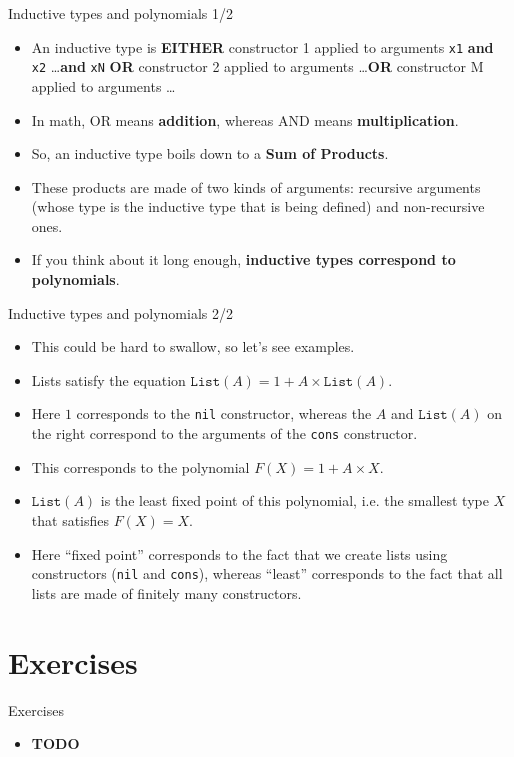 \documentclass{beamer}
\newcommand{\m}[1]{\texttt{#1}}
\begin{document}
\begin{frame}{Inductive types and polynomials 1/2}
\begin{itemize}
	\item An inductive type is \textbf{EITHER} constructor 1 applied to arguments \m{x1} \textbf{and} \m{x2} \dots \textbf{and} \m{xN} \textbf{OR} constructor 2 applied to arguments \dots \textbf{OR} constructor M applied to arguments \dots
	\item In math, OR means \textbf{addition}, whereas AND means \textbf{multiplication}.
	\item So, an inductive type boils down to a \textbf{Sum of Products}.
	\item These products are made of two kinds of arguments: recursive arguments (whose type is the inductive type that is being defined) and non-recursive ones.
	\item If you think about it long enough, \textbf{inductive types correspond to polynomials}.
\end{itemize}
\end{frame}

\begin{frame}{Inductive types and polynomials 2/2}
\begin{itemize}
	\item This could be hard to swallow, so let's see examples.
	\item Lists satisfy the equation $\m{List}(A) = 1 + A \times \m{List}(A)$.
	\item Here $1$ corresponds to the \m{nil} constructor, whereas the $A$ and $\m{List}(A)$ on the right correspond to the arguments of the \m{cons} constructor.
	\item This corresponds to the polynomial $F(X) = 1 + A \times X$.
	\item $\m{List}(A)$ is the least fixed point of this polynomial, i.e. the smallest type $X$ that satisfies $F(X) = X$.
	\item Here ``fixed point'' corresponds to the fact that we create lists using constructors (\m{nil} and \m{cons}), whereas ``least'' corresponds to the fact that all lists are made of finitely many constructors.
\end{itemize}
\end{frame}

\section{Exercises}

\begin{frame}{Exercises}
\begin{itemize}
	\item \textbf{TODO}
\end{itemize}
\end{frame}
\end{document}
